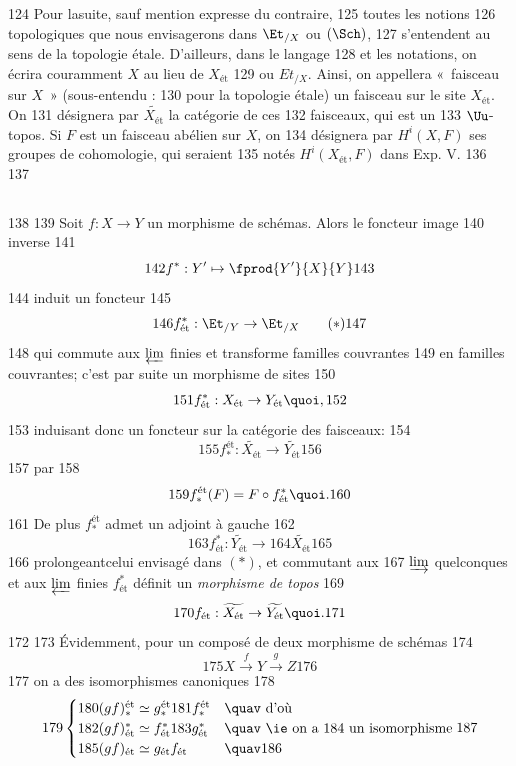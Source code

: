    124	Pour la\pageoriginale suite, sauf mention expresse du contraire,
   125	toutes les notions
   126	topologiques que nous envisagerons dans $\Et_{/X}$ ou $(\Sch)$,
   127	s'entendent au sens de la topologie étale. D'ailleurs, dans le langage
   128	et les notations, on écrira couramment $X$ au lieu de $X_{\text{ét}}$
   129	ou $Et_{/X}$. Ainsi, on appellera « faisceau sur $X$ » (sous-entendu :
   130	pour la topologie étale) un faisceau sur le site $X_{\text{ét}}$. On
   131	désignera par $\widetilde{X_{\text{ét}}}$ la catégorie de ces
   132	faisceaux, qui est un
   133	$\Uu$-topos. Si $F$ est un faisceau abélien sur $X$, on
   134	désignera par $H^{i} (X, F)$ ses groupes de cohomologie, qui seraient
   135	notés $H^{i} (X_{\text{ét}}, F)$ dans Exp. V.
   136	
   137	\subsection{}
   138	
   139	Soit $f : X \to Y$ un morphisme de schémas. Alors le foncteur image
   140	inverse
   141	$$
   142	f^{\ast} : Y' \mapsto \fprod{Y'}{X}{Y}
   143	$$
   144	induit un foncteur
   145	\begin{equation*}
   146	f^{\ast}_{\text{ét}} : \Et_{/Y} \to \Et_{/X}\tag{$\ast$}
   147	\end{equation*}
   148	qui commute aux $\varprojlim$ finies et transforme familles couvrantes
   149	en familles couvrantes; c'est par suite un morphisme de sites
   150	$$
   151	f^{\ast}_{\text{ét}} : X_{\text{ét}} \to Y_{\text{ét}}{\quoi},
   152	$$
   153	induisant donc un foncteur sur la catégorie des faisceaux:
   154	$$
   155	f^{\text{ét}}_{\ast} : \widetilde{X_{\text{ét}}} \to \widetilde{Y_{\text{ét}}}
   156	$$
   157	par
   158	$$
   159	f^{\text{ét}}_{\ast}  (F) = F \circ f^{\ast}_{\text{ét}}{\quoi}.
   160	$$
   161	De plus $f^{\text{ét}}_{\ast}$ admet un adjoint à gauche
   162	$$
   163	f^{\ast}_{\text{ét}} : \widetilde{Y_{\text{ét}}} \to
   164	\widetilde{X_{\text{ét}}}
   165	$$
   166	prolongeant\pageoriginale celui envisagé dans $(\ast)$, et commutant aux
   167	$\varinjlim$ quelconques et aux $\varprojlim$ finies 	$f^{\ast}_{\text{ét}}$ définit un \emph{morphisme de topos}
   169	$$
   170	f_{\text{ét}} : \widetilde{X_{\text{ét}}} \to \widetilde{Y_{\text{ét}}}{\quoi}.
   171	$$
   172	
   173	Évidemment, pour un composé de deux morphisme de schémas
   174	$$
   175	X \xrightarrow{f} Y \xrightarrow{g} Z
   176	$$
   177	on a des isomorphismes canoniques
   178	\begin{equation*}
   179	\begin{cases}
   180	(gf)^{\text{ét}}_{\ast} \simeq g_{\ast}^{\text{ét}}
   181	  f_{\ast}^{\text{ét}} &\quav \mbox{ d'où}\\
   182	(gf)^{\ast}_{\text{ét}} \simeq f^{\ast}_{\text{ét}}
   183	  g^{\ast}_{\text{ét}} &\quav \mbox{ \ie on a
   184	    un isomorphisme}\\
   185	(gf)_{\text{ét}} \simeq g_{\text{ét}} f_{\text{ét}}&\quav
   186	\end{cases}
   187	\end{equation*}
